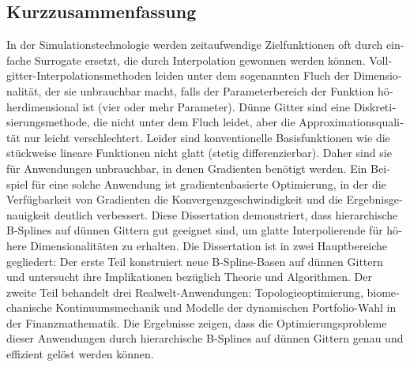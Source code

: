 \begin{otherlanguage}{ngerman}
  \section*{Kurzzusammenfassung}
  
  In der Simulationstechnologie werden zeitaufwendige Zielfunktionen
  oft durch einfache Surrogate ersetzt, die durch Interpolation
  gewonnen werden können.
  Vollgitter-Interpolationsmethoden leiden unter dem
  sogenannten Fluch der Dimensionalität,
  der sie unbrauchbar macht, falls der Parameterbereich der Funktion
  höherdimensional ist (vier oder mehr Parameter).
  Dünne Gitter sind eine Diskretisierungsmethode, die nicht unter
  dem Fluch leidet, aber die Approximationsqualität nur leicht verschlechtert.
  Leider sind konventionelle Basisfunktionen wie die stückweise
  lineare Funktionen nicht glatt (stetig differenzierbar).
  Daher sind sie für Anwendungen unbrauchbar, in denen Gradienten
  benötigt werden.
  Ein Beispiel für eine solche Anwendung ist gradientenbasierte Optimierung,
  in der die Verfügbarkeit von Gradienten die Konvergenzgeschwindigkeit und
  die Ergebnisgenauigkeit deutlich verbessert.
  Diese Dissertation demonstriert, dass hierarchische B-Splines auf
  dünnen Gittern gut geeignet sind,
  um glatte Interpolierende für höhere Dimensionalitäten zu erhalten.
  Die Dissertation ist in zwei Hauptbereiche gegliedert:
  Der erste Teil konstruiert neue B-Spline-Basen auf dünnen Gittern und
  untersucht ihre Implikationen bezüglich Theorie und Algorithmen.
  Der zweite Teil behandelt drei Realwelt-Anwendungen:
  Topologieoptimierung, biomechanische Kontinuumsmechanik und
  Modelle der dynamischen Portfolio-Wahl in der Finanzmathematik.
  Die Ergebnisse zeigen, dass die Optimierungsprobleme dieser
  Anwendungen durch hierarchische B-Splines auf dünnen Gittern
  genau und effizient gelöst werden können.
\end{otherlanguage}

\cleardoublepage
